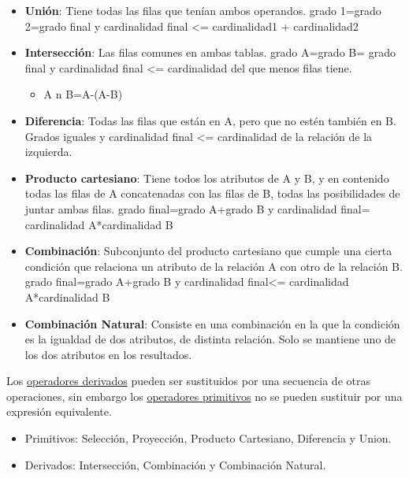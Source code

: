 \documentclass[12pt, twoside, openright]{report} %
\begin{document}
  \begin{itemize}
  \item \textbf{Unión}: Tiene todas las filas que tenían ambos operandos.
    grado 1=grado 2=grado final y cardinalidad final \textless=
    cardinalidad1 + cardinalidad2
    
  \item \textbf{Intersección}: Las filas comunes en ambas tablas. grado
    A=grado B= grado final y cardinalidad final \textless= cardinalidad
    del que menos filas tiene.
    

    \begin{itemize}
    \item A n B=A-(A-B)
      
    \end{itemize}
  \item \textbf{Diferencia}: Todas las filas que están en A, pero que no
    estén también en B. Grados iguales y cardinalidad final \textless=
    cardinalidad de la relación de la izquierda.
    
  \item \textbf{Producto cartesiano}: Tiene todos los atributos de A y B, y
    en contenido todas las filas de A concatenadas con las filas de B,
    todas las posibilidades de juntar ambas filas. grado final=grado
    A+grado B y cardinalidad final= cardinalidad A*cardinalidad B
    
  \item \textbf{Combinación}: Subconjunto del producto cartesiano que cumple
    una cierta condición que relaciona un atributo de la relación A con
    otro de la relación B. grado final=grado A+grado B y cardinalidad
    final\textless= cardinalidad A*cardinalidad B
    
  \item \textbf{Combinación Natural}: Consiste en una combinación en la que
    la condición es la igualdad de dos atributos, de distinta relación.
    Solo se mantiene uno de los dos atributos en los resultados.
    
  \end{itemize}

  
  Los \underline{operadores derivados} pueden ser sustituidos por una
  secuencia de otras operaciones, sin embargo los \underline{operadores
  primitivos} no se pueden sustituir por una expresión equivalente.
  

  \begin{itemize}
  \item Primitivos: Selección, Proyección, Producto Cartesiano, Diferencia y
    Union.
    
  \item Derivados: Intersección, Combinación y Combinación Natural.
    
  \end{itemize}
\end{document}
